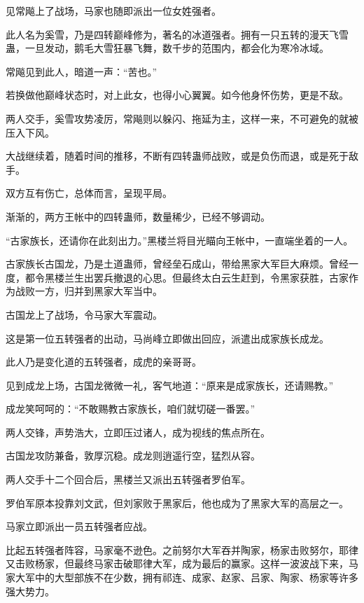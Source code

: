 
\begin{this_body}

见常飚上了战场，马家也随即派出一位女姓强者。

此人名为奚雪，乃是四转巅峰修为，著名的冰道强者。拥有一只五转的漫天飞雪蛊，一旦发动，鹅毛大雪狂暴飞舞，数千步的范围内，都会化为寒冷冰域。

常飚见到此人，暗道一声：“苦也。”

若换做他巅峰状态时，对上此女，也得小心翼翼。如今他身怀伤势，更是不敌。

两人交手，奚雪攻势凌厉，常飚则以躲闪、拖延为主，这样一来，不可避免的就被压入下风。

大战继续着，随着时间的推移，不断有四转蛊师战败，或是负伤而退，或是死于敌手。

双方互有伤亡，总体而言，呈现平局。

渐渐的，两方王帐中的四转蛊师，数量稀少，已经不够调动。

“古家族长，还请你在此刻出力。”黑楼兰将目光瞄向王帐中，一直端坐着的一人。

古家族长古国龙，乃是土道蛊师，曾经垒石成山，带给黑家大军巨大麻烦。曾经一度，都令黑楼兰生出罢兵撤退的心思。但最终太白云生赶到，令黑家获胜，古家作为战败一方，归并到黑家大军当中。

古国龙上了战场，令马家大军震动。

这是第一位五转强者的出动，马尚峰立即做出回应，派遣出成家族长成龙。

此人乃是变化道的五转强者，成虎的亲哥哥。

见到成龙上场，古国龙微微一礼，客气地道：“原来是成家族长，还请赐教。”

成龙笑呵呵的：“不敢赐教古家族长，咱们就切磋一番罢。”

两人交锋，声势浩大，立即压过诸人，成为视线的焦点所在。

古国龙攻防兼备，敦厚沉稳。成龙则逍遥行空，猛烈从容。

两人交手十二个回合后，黑楼兰又派出五转强者罗伯军。

罗伯军原本投靠刘文武，但刘家败于黑家后，他也成为了黑家大军的高层之一。

马家立即派出一员五转强者应战。

比起五转强者阵容，马家毫不逊色。之前努尔大军吞并陶家，杨家击败努尔，耶律又击败杨家，但最终马家击破耶律大军，成为最后的赢家。这样一波波战下来，马家大军中的大型部族不在少数，拥有祁连、成家、赵家、吕家、陶家、杨家等许多强大势力。


\end{this_body}
